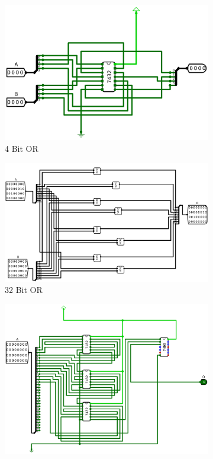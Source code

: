 \documentclass[12pt]{article}
\begin{document}
\begin{figure}[H]
\centering
 \begin{subfigure}[b]{0.3\textwidth}
  \includegraphics[width=\textwidth]{Images/4OR.png}
  \caption{4 Bit OR}
  \label{fig:4or}
  \end{subfigure}
  \begin{subfigure}[b]{0.3\textwidth}
  \includegraphics[width=\textwidth]{Images/32OR.png}
  \caption{32 Bit OR}
  \label{fig:32or}
  \end{subfigure}
  \begin{subfigure}[b]{0.3\textwidth}
  \includegraphics[width=\textwidth]{Images/Rounding.png}

\end{subfigure}
\end{figure}
\end{document}
